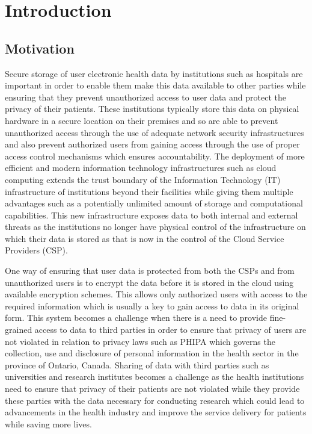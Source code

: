 \chapter{Introduction}
\label{chap:introduction}


\section{Motivation}

Secure storage of user electronic health data by institutions such as hospitals are important in order to enable them make this data available to other parties while ensuring that they prevent unauthorized access to user data and protect the privacy of their patients. These institutions typically store this data on physical hardware in a secure location on their premises and so are able to prevent unauthorized access through the use of adequate network security infrastructures and also prevent authorized users from gaining access through the use of proper access control mechanisms which ensures accountability. The deployment of more efficient and modern information technology infrastructures such as cloud computing extends the trust boundary of the Information Technology (IT) infrastructure of institutions beyond their facilities while giving them multiple advantages such as a potentially unlimited amount of storage and computational capabilities. This new infrastructure exposes data to both internal and external threats as the institutions no longer have physical control of the infrastructure on which their data is stored as that is now in the control of the Cloud Service Providers (CSP).

One way of ensuring that user data is protected from both the CSPs and from unauthorized users is to encrypt the data before it is stored in the cloud using available encryption schemes. This allows only authorized users with access to the required information which is usually a key to gain access to data in its original form. This system becomes a challenge when there is a need to provide fine-grained access to data to third parties in order to ensure that privacy of users are not violated in relation to privacy laws such as PHIPA \cite{pihipa} which governs the collection, use and disclosure of personal information in the health sector in the province of Ontario, Canada. Sharing of data with third parties such as universities and research institutes becomes a challenge as the health institutions need to ensure that privacy of their patients are not violated while they provide these parties with the data necessary for conducting research which could lead to advancements in the health industry and improve the service delivery for patients while saving more lives.


